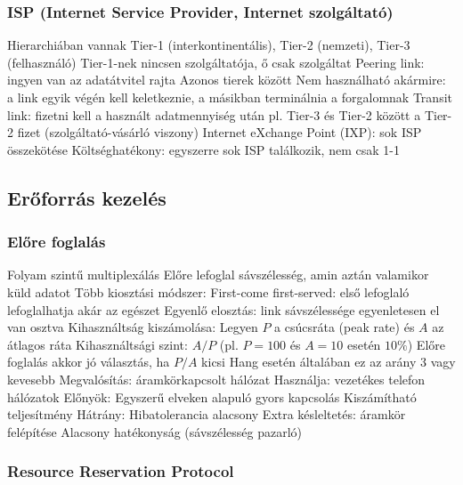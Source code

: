 \documentclass[12pt,a4paper]{article}
\begin{document}
\subsubsection{ISP (Internet Service Provider, Internet szolgáltató)}

\begin{outline}
	\1 Hierarchiában vannak
		\2 Tier-1 (interkontinentális), Tier-2 (nemzeti), Tier-3 (felhasználó)
		\2 Tier-1-nek nincsen szolgáltatója, ő csak szolgáltat
	\1 Peering link: ingyen van az adatátvitel rajta
		\2 Azonos tierek között
		\2 Nem használható akármire: a link egyik végén kell keletkeznie, a másikban terminálnia a forgalomnak
	\1 Transit link: fizetni kell a használt adatmennyiség után
		\2 pl. Tier-3 és Tier-2 között a Tier-2 fizet (szolgáltató-vásárló viszony)
	\1 Internet eXchange Point (IXP): sok ISP összekötése
		\2 Költséghatékony: egyszerre sok ISP találkozik, nem csak 1-1
\end{outline}

\pagebreak

\subsection{Erőforrás kezelés}

\subsubsection{Előre foglalás}

\begin{outline}
	\1 Folyam szintű multiplexálás
	\1 Előre lefoglal sávszélesség, amin aztán valamikor küld adatot
	\1 Több kiosztási módszer:
		\2 First-come first-served: első lefoglaló lefoglalhatja akár az egészet
		\2 Egyenlő elosztás: link sávszélessége egyenletesen el van osztva
	\1 Kihasználtság kiszámolása:
		\2 Legyen $P$ a csúcsráta (peak rate) és $A$ az átlagos ráta
		\2 Kihasználtsági szint: $A/P$ (pl. $P=100$ és $A=10$ esetén $10\%$)
		\2 Előre foglalás akkor jó választás, ha $P/A$ kicsi
			\3 Hang esetén általában ez az arány 3 vagy kevesebb
	\1 Megvalósítás: áramkörkapcsolt hálózat
		\2 Használja: vezetékes telefon hálózatok
	\1 Előnyök:
		\2 Egyszerű elveken alapuló gyors kapcsolás
		\2 Kiszámítható teljesítmény
	\1 Hátrány:
		\2 Hibatolerancia alacsony
		\2 Extra késleltetés: áramkör felépítése
		\2 Alacsony hatékonyság (sávszélesség pazarló)
\end{outline}

\subsubsection{Resource Reservation Protocol}
\end{document}
